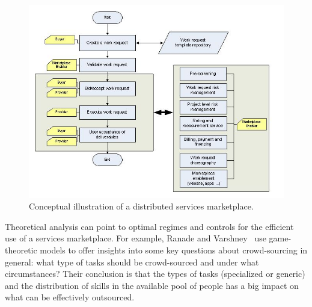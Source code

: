 \begin{figure}[t]
\centering
\includegraphics[bb=13 20 530 365, scale=0.53]{figs/glomarketplace.jpg}
\vspace*{-15pt}
\caption{Conceptual illustration of a distributed services marketplace.}
\vspace*{-15pt}
\label{glomarketplace}
\end{figure}

Theoretical analysis can point to optimal regimes and controls for the efficient
use of a services marketplace. For example, Ranade and
Varshney~\cite{glo-ranade} use game-theoretic models to offer insights into some
key questions about crowd-sourcing in general: what type of tasks should be
crowd-sourced and under what circumstances? Their conclusion is that the types
of tasks (specialized or generic) and the distribution of skills in the
available pool of people has a big impact on what can be effectively outsourced.




